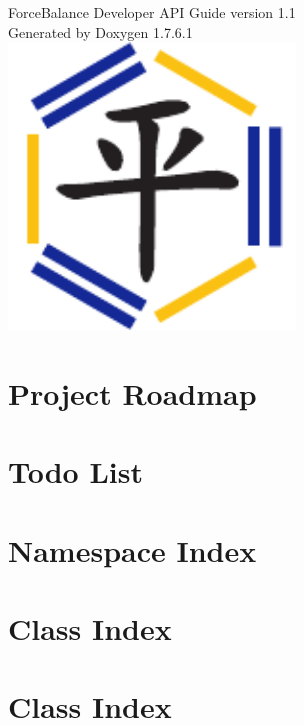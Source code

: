 \documentclass[letterpaper]{article}
\begin{document}
\hypersetup{pageanchor=false,citecolor=blue}
\begin{titlepage}
\vspace*{1cm}
\begin{center}

{\Large ForceBalance Developer API Guide version 1.1}\\
\vspace*{2cm}
{\large Generated by Doxygen 1.7.6.1}\\
\vspace*{2.5 cm}
\includegraphics[width=3in]{ForceBalance}
\end{center}
\end{titlepage}
\tableofcontents
{}
\hypersetup{pageanchor=true,citecolor=blue}
\section{\-Project \-Roadmap}
\label{roadmap}
\hypertarget{roadmap}{}

\section{\-Todo \-List}
\label{todo}
\hypertarget{todo}{}

\section{\-Namespace \-Index}

\section{\-Class \-Index}

\section{\-Class \-Index}

\end{document}

